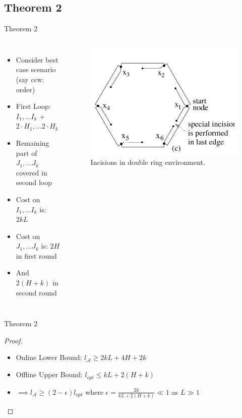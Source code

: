 \documentclass{beamer}
\begin{document}
\subsection{Theorem 2}
\begin{frame}{Theorem 2}
    \begin{columns}
        \begin{itemize}
            \item Consider best case scenario (say ccw. order)
            \item First Loop: $I_1, ... I_k$ + $2 \cdot H_1, ... 2 \cdot H_k$
            \item Remaining part of $J_1, ... J_k$ covered in second loop
            \item Cost on $I_1, ... I_k$ is: $2kL$
            \item Cost on $J_1, ... J_k$ is: $2H$ in first round
            \item And $2(H + k)$ in second round
        \end{itemize}
        \begin{figure}
            \includegraphics[width=\linewidth]{Images/fig13c.png}
            \caption{Incisions in double ring environment.}
        \end{figure}
    \end{columns}
\end{frame}

\begin{frame}{Theorem 2}
    \begin{proof}
        \begin{itemize}
            \item Online Lower Bound: $l_{\mathcal{A}} \geq 2kL + 4H + 2k$
            \item Offline Upper Bound: $l_{opt} \leq kL + 2(H + k)$
            \item $\implies l_{\mathcal{A}} \geq (2 - \epsilon) l_{opt}$ where $\epsilon = \frac{2k}{kL + 2(H + k)} \ll 1$ as $L \gg 1$
        \end{itemize}
    \end{proof}
\end{frame}
\end{document}
